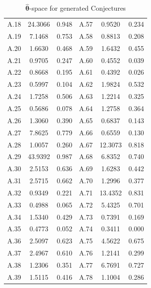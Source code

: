 \documentclass[11pt,reqno]{amsart}
\theoremstyle{plain}\newtheorem{theorem}{Theorem}[section]
\numberwithin{equation}{section}
\begin{document}
\begin{table}[ht]
\begin{tabular}{|c|c|c||c|c|c|}
A.18 & 24.3066 & 0.948 & A.57 & 0.9520  & 0.234 \\
A.19 & 7.1468  & 0.753 & A.58 & 0.8813  & 0.208 \\
A.20 & 1.6630  & 0.468 & A.59 & 1.6432  & 0.455 \\
A.21 & 0.9705  & 0.247 & A.60 & 0.4552  & 0.039 \\
A.22 & 0.8668  & 0.195 & A.61 & 0.4392  & 0.026 \\
A.23 & 0.5997  & 0.104 & A.62 & 1.9824  & 0.532 \\
A.24 & 1.7258  & 0.506 & A.63 & 1.2214  & 0.325 \\
A.25 & 0.5686  & 0.078 & A.64 & 1.2758  & 0.364 \\
A.26 & 1.3060  & 0.390 & A.65 & 0.6837  & 0.143 \\
A.27 & 7.8625  & 0.779 & A.66 & 0.6559  & 0.130 \\
A.28 & 1.0057  & 0.260 & A.67 & 12.3073 & 0.818 \\
A.29 & 43.9392 & 0.987 & A.68 & 6.8352  & 0.740 \\
A.30 & 2.5153  & 0.636 & A.69 & 1.6283  & 0.442 \\
A.31 & 2.5715  & 0.662 & A.70 & 1.2996  & 0.377 \\
A.32 & 0.9349  & 0.221 & A.71 & 13.4352 & 0.831 \\
A.33 & 0.4988  & 0.065 & A.72 & 5.4325  & 0.701 \\
A.34 & 1.5340  & 0.429 & A.73 & 0.7391  & 0.169 \\
A.35 & 0.4773  & 0.052 & A.74 & 0.3411  & 0.000 \\
A.36 & 2.5097  & 0.623 & A.75 & 4.5622  & 0.675 \\
A.37 & 2.4967  & 0.610 & A.76 & 1.2141  & 0.299 \\
A.38 & 1.2306  & 0.351 & A.77 & 6.7691  & 0.727 \\
A.39 & 1.5115  & 0.416 & A.78 & 1.1004  & 0.286 \\
\hline
\end{tabular}
\caption{$\bm{\hat{\theta}}$-space for generated  Conjectures}
\label{newthetaspacetable}
\end{table}
\end{document}
